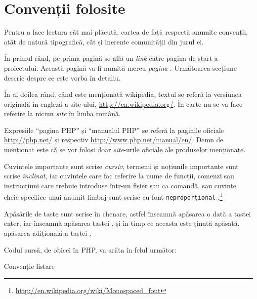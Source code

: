 \section*{Convenții folosite}
{}

Pentru a face lectura cât mai plăcută, cartea de față respectă anumite
convenții, atât de natură tipografică, cât și inerente comunității din jurul
ei.

În primul rând, pe prima pagină se află un \textit{link} către pagina de
start a proiectului. Această pagină va fi numită mereu \textit{pagina {\phpro}}.
Următoarea secțiune descrie despre ce este vorba în detaliu.

În al doilea rând, când este menționată wikipedia, textul se referă la
versiunea originală în engleză a site-ului, \url{http://en.wikipedia.org/}. În
carte nu se va face referire la niciun \textit{site} în limba română.

Expresiile ``pagina PHP'' și ``manualul PHP'' se referă la paginile oficiale
\url{http://php.net/} și respectiv \url{http://www.php.net/manual/en/}. Demn de
menționat este că se vor folosi doar \textit{site}-urile oficiale ale
produselor menționate.


Cuvintele importante sunt scrise \textit{cursiv}, termenii și noțiunile
importante sunt scrise \textsl{înclinat}, iar cuvintele care fac referire la
nume de funcții, comenzi sau instrucțiuni care trebuie introduse într-un fișier
sau ca comandă, sau cuvinte cheie specifice unui anumit limbaj sunt scrise cu
font
\texttt{neproporțional}%
.\footnote{\url{http://en.wikipedia.org/wiki/Monospaced_font}}

Apăsările de taste sunt scrise în chenare, astfel  înseamnă
apăsarea o dată a tastei enter, iar  înseamnă apăsarea tastei
, și în timp ce aceasta este ținută apăsată, apăsarea
adițională a tastei .

Codul sursă, de obicei în PHP, va arăta în felul următor:

\begin{listing}[H]
    \caption{Convenție listare}
\end{listing}

